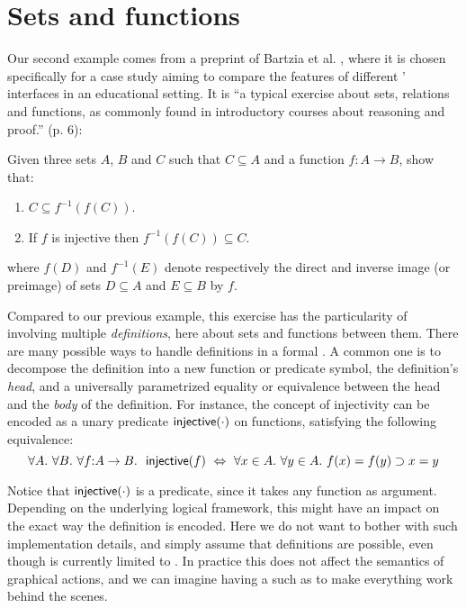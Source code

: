 \section{Sets and functions}

Our second example comes from a preprint of Bartzia et al.
\cite{bartzia:hal-04087080}, where it is chosen specifically for a case study
aiming to compare the features of different ' interfaces in an
educational setting. It is ``a typical exercise about sets, relations and
functions, as commonly found in introductory courses about reasoning and
proof.'' (p. 6):

\begin{exercise}
  Given three sets $A$, $B$ and $C$ such that $C \subseteq A$ and a function $f
  : A \to B$, show that:
  \begin{enumerate}
    \item $C \subseteq f^{-1}(f(C))$.
    \item If $f$ is injective then $f^{-1}(f(C)) \subseteq C$.
  \end{enumerate}
  where $f(D)$ and $f^{-1}(E)$ denote respectively the direct and inverse image
  (or preimage) of sets $D \subseteq A$ and $E \subseteq B$ by $f$.
\end{exercise}

Compared to our previous example, this exercise has the particularity of
involving multiple \emph{definitions}, here about sets and functions between
them. There are many possible ways to handle definitions in a formal . A common one is to decompose the definition into a new function or
predicate symbol, the definition's \emph{head}, and a universally parametrized
equality or equivalence between the head and the \emph{body} of the definition.
For instance, the concept of injectivity can be encoded as a unary predicate
$\mbox{\textsf{injective}}(\cdot)$ on functions, satisfying the following equivalence:
$$\forall A.\ \forall B.\ \forall f{:}A \to B.~\ \injective(f) ~\lequiv~ \forall x
\in A.\ \forall y \in A.\ f(x) = f(y) \limp x = y$$

Notice that $\mbox{\textsf{injective}}(\cdot)$ is a \emph{} predicate, since it
takes any function as argument. Depending on the underlying logical framework,
this might have an impact on the exact way the definition is encoded. Here we do
not want to bother with such implementation details, and simply assume that
 definitions are possible, even though  is currently limited
to . In practice this does not affect the semantics of
graphical actions, and we can imagine having a   such as
 to make everything work behind the scenes.

